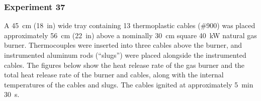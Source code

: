 \clearpage

\subsubsection{Experiment 37}

A 45~cm (18~in) wide tray containing 13 thermoplastic cables (\#900) was placed approximately 56~cm (22~in) above a nominally 30~cm square 40~kW natural gas burner. Thermocouples were inserted into three cables above the burner, and instrumented aluminum rods (``slugs'') were placed alongside the instrumented cables. The figures below show the heat release rate of the gas burner and the total heat release rate of the burner and cables, along with the internal temperatures of the cables and slugs. The cables ignited at approximately 5~min 30~s.

